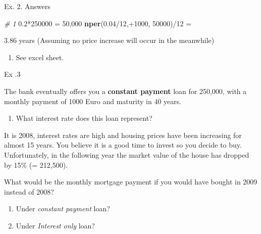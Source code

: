 \documentclass[ignorenonframetext,]{beamer}
\newenvironment{Shaded}{\begin{snugshade}}{\end{snugshade}}
\newcommand{\KeywordTok}[1]{\textcolor[rgb]{0.13,0.29,0.53}{\textbf{{#1}}}}
\newcommand{\DecValTok}[1]{\textcolor[rgb]{0.00,0.00,0.81}{{#1}}}
\newcommand{\FloatTok}[1]{\textcolor[rgb]{0.00,0.00,0.81}{{#1}}}
\newcommand{\StringTok}[1]{\textcolor[rgb]{0.31,0.60,0.02}{{#1}}}
\newcommand{\CommentTok}[1]{\textcolor[rgb]{0.56,0.35,0.01}{\textit{{#1}}}}
\newcommand{\NormalTok}[1]{{#1}}
\providecommand{\tightlist}{%
\setlength{\itemsep}{0pt}\setlength{\parskip}{0pt}}
\begin{document}
\begin{frame}[fragile]{Ex. 2. Answers}

\footnotesize

\begin{Shaded}
\begin{Highlighting}[]
\CommentTok{# 1}
\FloatTok{0.2}\NormalTok{*}\DecValTok{250000} \NormalTok{=}\StringTok{ }\DecValTok{50}\NormalTok{,}\DecValTok{000}
\KeywordTok{nper}\NormalTok{(}\FloatTok{0.04}\NormalTok{/}\DecValTok{12}\NormalTok{,+}\DecValTok{1000}\NormalTok{, }\DecValTok{50000}\NormalTok{)/}\DecValTok{12} \NormalTok{=}\StringTok{ }

\FloatTok{3.86} \NormalTok{years }
\NormalTok{(Assuming no price increase will occur in the meanwhile)}
\end{Highlighting}
\end{Shaded}

\normalsize

\begin{enumerate}
\def\labelenumi{\arabic{enumi}.}
\setcounter{enumi}{1}
\tightlist
\item
  See excel sheet.
\end{enumerate}

\end{frame}

\begin{frame}{Ex .3}

The bank eventually offers you a \textbf{constant payment} loan for
250,000, with a monthly payment of 1000 Euro and maturity in 40 years.

\begin{enumerate}
\def\labelenumi{\arabic{enumi}.}
\tightlist
\item
  What interest rate does this loan represent?
\end{enumerate}

It is 2008, interest rates are high and housing prices have been
increasing for almost 15 years. You believe it is a good time to invest
so you decide to buy. Unfortunately, in the following year the market
value of the house has dropped by 15\% (= 212,500).

What would be the monthly mortgage payment if you would have bought in
2009 instead of 2008?

\begin{enumerate}
\def\labelenumi{\arabic{enumi}.}
\setcounter{enumi}{1}
\tightlist
\item
  Under \emph{constant payment} loan?
\item
  Under \emph{Interest only} loan?
\end{enumerate}

\end{frame}
\end{document}
